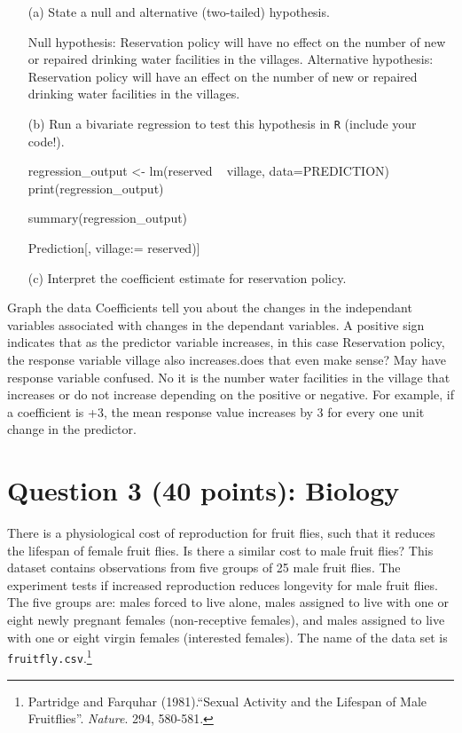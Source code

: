 \documentclass[12pt,letterpaper]{article}
\begin{document}
	\newpage
	\begin{enumerate}
		\item [(a)] State a null and alternative (two-tailed) hypothesis. 
		
		\vspace{6cm}
		Null hypothesis: Reservation policy will have no effect on the number of new or repaired drinking water facilities in the villages. 
		Alternative hypothesis: Reservation policy will have an effect on the number of new or repaired drinking water facilities in the villages.
		
		
		\item [(b)] Run a bivariate regression to test this hypothesis in \texttt{R} (include your code!).
		
		\vspace{6cm}
		
		regression_output <- lm(reserved ~ village, data=PREDICTION)
		print(regression_output)
		
		summary(regression_output)
		
		Prediction[, village:= reserved)]
		\item [(c)] Interpret the coefficient estimate for reservation policy. 
	\end{enumerate}
	Graph the data
	Coefficients tell you about the changes in the independant variables associated with changes in the dependant variables. A positive sign indicates that as the predictor variable increases, in this case Reservation policy, the response variable village also increases.does that even make sense? May have response variable confused. No it is the number water facilities in the village that increases or do not increase depending on the positive or negative. For example, if a coefficient is +3, the mean response value increases by 3 for every one unit change in the predictor. 
	
	\newpage
	\section*{Question 3 (40 points): Biology}
	
	There is a physiological cost of reproduction for fruit flies, such that it reduces the lifespan of female fruit flies.  Is there a similar cost to male fruit flies?  This dataset contains observations from five groups of 25 male fruit flies. The experiment tests if increased reproduction reduces longevity for male fruit flies. The five groups are: males forced to live alone, males assigned to live with one or eight newly pregnant females (non-receptive females), and males assigned to live with one or eight virgin females (interested females). The name of the data set is \texttt{fruitfly.csv}.\footnote{Partridge and Farquhar (1981).``Sexual Activity and the Lifespan of Male Fruitflies''. \textit{Nature}. 294, 580-581.}
	\vspace{1cm}
	
\end{document}

